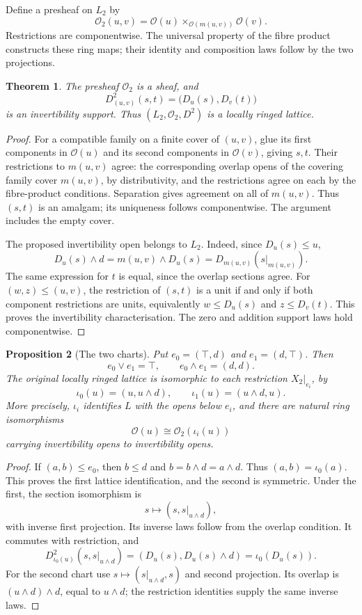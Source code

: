\documentclass[11pt]{amsart}
\newtheorem{theorem}{Theorem}[section]
\newtheorem{proposition}[theorem]{Proposition}
\theoremstyle{definition}
\theoremstyle{remark}
\newcommand{\OO}{\mathcal O}
\newcommand{\restr}[2]{#1|_{#2}}
\begin{document}
Define a presheaf on $L_2$ by
\[
 \OO_2(u,v)=\OO(u)\times_{\OO(m(u,v))}\OO(v).
\]
Restrictions are componentwise. The universal property of the fibre
product constructs these ring maps; their identity and composition laws
follow by the two projections.

\begin{theorem}\label{thm:double}
The presheaf $\OO_2$ is a sheaf, and
\[
 D^2_{(u,v)}(s,t)=\bigl(D_u(s),D_v(t)\bigr)
\]
is an invertibility support. Thus $(L_2,\OO_2,D^2)$ is a locally ringed
lattice.
\end{theorem}
\begin{proof}
For a compatible family on a finite cover of $(u,v)$, glue its first
components in $\OO(u)$ and its second components in $\OO(v)$, giving
$s,t$. Their restrictions to $m(u,v)$ agree: the corresponding overlap
opens of the covering family cover $m(u,v)$, by distributivity, and
the restrictions agree on each by the fibre-product conditions.
Separation gives agreement on all of $m(u,v)$. Thus $(s,t)$ is an
amalgam; its uniqueness follows componentwise. The argument includes
the empty cover.

The proposed invertibility open belongs to $L_2$. Indeed, since
$D_u(s)\leq u$,
\[
 D_u(s)\wedge d=m(u,v)\wedge D_u(s)
                 =D_{m(u,v)}(\restr{s}{m(u,v)}).
\]
The same expression for $t$ is equal, since the overlap sections agree.
For $(w,z)\leq(u,v)$, the restriction of $(s,t)$ is a unit if and only
if both component restrictions are units, equivalently
$w\leq D_u(s)$ and $z\leq D_v(t)$. This proves the invertibility
characterisation. The zero and addition support laws hold componentwise.
\end{proof}

\begin{proposition}[The two charts]\label{prop:charts}
Put $e_0=(\top,d)$ and $e_1=(d,\top)$. Then
\[
 e_0\vee e_1=\top,\qquad e_0\wedge e_1=(d,d).
\]
The original locally ringed lattice is isomorphic to each restriction
$X_2|_{e_i}$, by
\[
 \iota_0(u)=(u,u\wedge d),\qquad
 \iota_1(u)=(u\wedge d,u).
\]
More precisely, $\iota_i$ identifies $L$ with the opens below $e_i$,
and there are natural ring isomorphisms
\[
 \OO(u)\cong\OO_2(\iota_i(u))
\]
carrying invertibility opens to invertibility opens.
\end{proposition}
\begin{proof}
If $(a,b)\leq e_0$, then $b\leq d$ and
$b=b\wedge d=a\wedge d$. Thus $(a,b)=\iota_0(a)$. This proves the first
lattice identification, and the second is symmetric. Under the first,
the section isomorphism is
\[
 s\longmapsto(s,\restr{s}{u\wedge d}),
\]
with inverse first projection. Its inverse laws follow from the overlap
condition. It commutes with restriction, and
\[
 D^2_{\iota_0(u)}(s,\restr{s}{u\wedge d})
  =(D_u(s),D_u(s)\wedge d)=\iota_0(D_u(s)).
\]
For the second chart use $s\mapsto(\restr{s}{u\wedge d},s)$ and second
projection. Its overlap is $(u\wedge d)\wedge d$, equal to $u\wedge d$;
the restriction identities supply the same inverse laws.
\end{proof}
\end{document}
